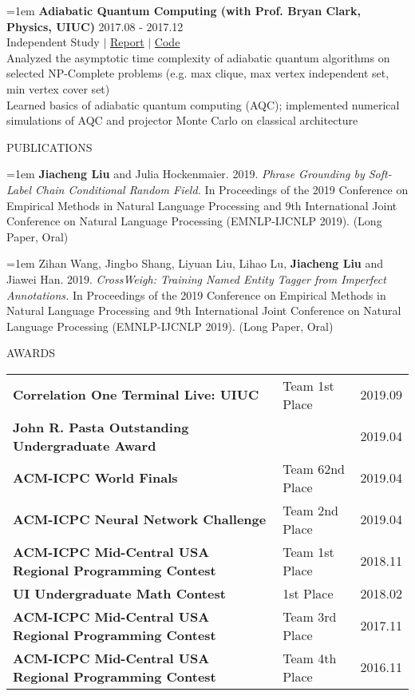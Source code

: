 \documentclass[10pt]{article}
\begin{document}
\hangindent=1em
\textbf{Adiabatic Quantum Computing (with Prof. Bryan Clark, Physics, UIUC)} \hfill 2017.08 - 2017.12 \\
Independent Study $|$ \href{https://github.com/liujch1998/AQC/blob/master/report/report.pdf}{Report} $|$ \href{https://github.com/liujch1998/AQC}{Code} \\
Analyzed the asymptotic time complexity of adiabatic quantum algorithms on selected NP-Complete problems (e.g. max clique, max vertex independent set, min vertex cover set) \\
Learned basics of adiabatic quantum computing (AQC); implemented numerical simulations of AQC and projector Monte Carlo on classical architecture

\vspace{1em}
{\LARGE PUBLICATIONS}

\hangindent=1em
\textbf{Jiacheng Liu} and Julia Hockenmaier. 2019. \emph{Phrase Grounding by Soft-Label Chain Conditional Random Field.} In Proceedings of the 2019 Conference on Empirical Methods in Natural Language Processing and 9th International Joint Conference on Natural Language Processing (EMNLP-IJCNLP 2019). (Long Paper, Oral)

\hangindent=1em
Zihan Wang, Jingbo Shang, Liyuan Liu, Lihao Lu, \textbf{Jiacheng Liu} and Jiawei Han. 2019. \emph{CrossWeigh: Training Named Entity Tagger from Imperfect Annotations.} In Proceedings of the 2019 Conference on Empirical Methods in Natural Language Processing and 9th International Joint Conference on Natural Language Processing (EMNLP-IJCNLP 2019). (Long Paper, Oral)

\newpage

\vspace{1em}
{\LARGE AWARDS}

\begin{tabularx}{\textwidth}{X l r}
\textbf{Correlation One Terminal Live: UIUC} & Team 1st Place & 2019.09 \\
\textbf{John R. Pasta Outstanding Undergraduate Award} & & 2019.04 \\
\textbf{ACM-ICPC World Finals} & Team 62nd Place & 2019.04 \\
\textbf{ACM-ICPC Neural Network Challenge} & Team 2nd Place & 2019.04 \\
\textbf{ACM-ICPC Mid-Central USA Regional Programming Contest} & Team 1st Place & 2018.11 \\
\textbf{UI Undergraduate Math Contest} & 1st Place & 2018.02 \\
\textbf{ACM-ICPC Mid-Central USA Regional Programming Contest} & Team 3rd Place & 2017.11 \\
\textbf{ACM-ICPC Mid-Central USA Regional Programming Contest} & Team 4th Place & 2016.11
\end{tabularx}
\end{document}
